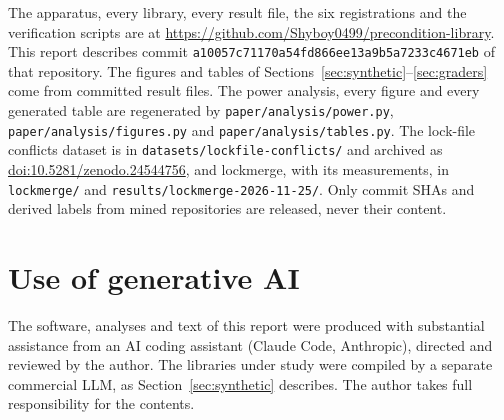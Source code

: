 \documentclass[11pt]{article}
\newcommand{\code}[1]{\texttt{#1}}
\begin{document}
The apparatus, every library, every result file, the six registrations and the
verification scripts are at \url{https://github.com/Shyboy0499/precondition-library}. This
report describes commit \code{a10057c71170a54fd866ee13a9b5a7233c4671eb} of that repository.
The figures and tables of Sections~\ref{sec:synthetic}--\ref{sec:graders} come from committed
result files. The power analysis, every figure and every generated table are regenerated by
\code{paper/analysis/power.py}, \code{paper/analysis/figures.py} and
\code{paper/analysis/tables.py}. The lock-file conflicts dataset is in
\code{datasets/lockfile-conflicts/} and archived as
\href{https://doi.org/10.5281/zenodo.24544756}{doi:10.5281/zenodo.24544756}, and lockmerge, with its measurements, in \code{lockmerge/}
and \code{results/lockmerge-2026-11-25/}. Only commit SHAs and derived labels from mined
repositories are released, never their content.

\section*{Use of generative AI}

The software, analyses and text of this report were produced with substantial assistance from an
AI coding assistant (Claude Code, Anthropic), directed and reviewed by the author. The libraries
under study were compiled by a separate commercial LLM, as Section~\ref{sec:synthetic} describes.
The author takes full responsibility for the contents.
\end{document}
